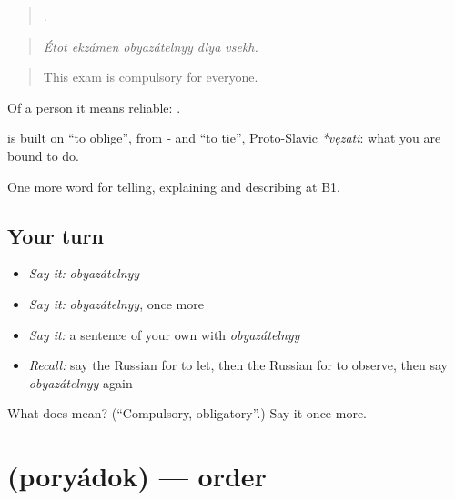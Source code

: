 \begin{quote}
    .
\end{quote}

\begin{quote}
\emph{Étot ekzámen obyazátelnyy dlya vsekh.}
\end{quote}

\begin{quote}
This exam is compulsory for everyone.
\end{quote}

Of a person it means reliable: \emph{  }.

\begin{cousinweb}
\textbf{} is built on \emph{} \textquotedblleft{}to oblige\textquotedblright{}, from \emph{-} and \emph{} \textquotedblleft{}to tie\textquotedblright{}, Proto-Slavic \emph{*vęzati}: what you are bound to do.
\end{cousinweb}

\begin{grammarlens}[title={What you've built}]
One more word for telling, explaining and describing at B1.
\end{grammarlens}

\subsection*{Your turn}
\begin{itemize}
\raggedright
  \item \emph{Say it:} \emph{obyazátelnyy}
  \item \emph{Say it:} \emph{obyazátelnyy}, once more
  \item \emph{Say it:} a sentence of your own with \emph{obyazátelnyy}
  \item \emph{Recall:} say the Russian for to let, then the Russian for to observe, then say \emph{obyazátelnyy} again
\end{itemize}

\begin{tcolorbox}[breakable,colback=teal!4,colframe=teal!35!black,title={Before you move on}]
What does  mean? (\textquotedblleft{}Compulsory, obligatory\textquotedblright{}.) Say it once more.
\end{tcolorbox}
\section[\texorpdfstring{\ru{порядок} (poryádok)}{порядок (poryádok)}]{ (poryádok) — order}

